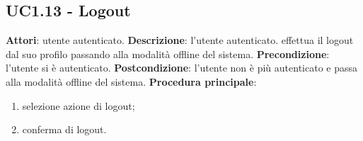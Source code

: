 \subsection{UC1.13 - Logout}{
	\label{uc1.13}
	\textbf{Attori}: utente autenticato.
	\textbf{Descrizione}: l'utente autenticato. effettua il logout dal suo profilo passando alla modalità offline del sistema.
	\textbf{Precondizione}: l'utente si è autenticato.
	\textbf{Postcondizione}: l'utente non è più autenticato e passa alla modalità offline del sistema.
	\textbf{Procedura principale}:
	\begin{enumerate}
		\item selezione azione di logout;
		\item conferma di logout.
	\end{enumerate}
}